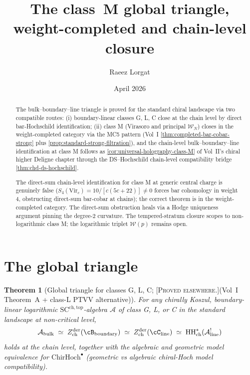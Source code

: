 \documentclass[11pt]{amsart}
\title{The class~M global triangle,\\
weight-completed and chain-level closure}
\author{Raeez Lorgat}
\date{April 2026}
\newtheorem{theorem}{Theorem}[section]
\theoremstyle{definition}
\theoremstyle{remark}
\providecommand{\ChirHoch}{\mathrm{ChirHoch}}
\providecommand{\Zder}{Z^{\mathrm{der}}_{\mathrm{ch}}}
\providecommand{\cA}{\mathcal{A}}
\providecommand{\cW}{\mathcal{W}}
\providecommand{\ClaimStatusProvedElsewhere}{\textsc{[Proved elsewhere.]}}
\begin{document}
\maketitle

\begin{abstract}
The bulk--boundary--line triangle is proved for the standard chiral
landscape via two compatible routes: (i) boundary-linear classes
G, L, C close at the chain level by direct bar-Hochschild
identification; (ii) class M (Virasoro and principal $\cW_N$)
closes in the weight-completed category via the MC5 pattern
(Vol~I \ref*{thm:completed-bar-cobar-strong} plus
\ref*{prop:standard-strong-filtration}), and the chain-level
bulk--boundary--line identification at class M follows as
\ref*{cor:universal-holography-class-M} of Vol~II's chiral
higher Deligne chapter through the DS--Hochschild chain-level
compatibility bridge \ref*{thm:chd-ds-hochschild}.

The direct-sum chain-level identification for class M at generic
central charge is genuinely false (\(S_4(\mathrm{Vir}_c) =
10/[c(5c+22)] \neq 0\) forces bar cohomology in weight~$4$,
obstructing direct-sum bar-cobar at chains); the correct theorem
is in the weight-completed category. The direct-sum obstruction heals via a Hodge
uniqueness argument pinning the degree-$2$ curvature. The
tempered-stratum closure scopes to non-logarithmic class M; the
logarithmic triplet $\cW(p)$ remains open.
\end{abstract}

\section{The global triangle}
\label{sec:global-triangle-classM}

\begin{theorem}[Global triangle for classes G, L, C;
\ClaimStatusProvedElsewhere (Vol~I Theorem~A + class-L PTVV
alternative)]%
\label{thm:triangle-GLC}%
For any chirally Koszul, boundary-linear logarithmic
$\mathrm{SC}^{\mathrm{ch,top}}$-algebra $\cA$ of class G, L, or C
in the standard landscape at non-critical level,
\[
  \cA_{\mathrm{bulk}}
  \;\simeq\;
  \Zder(\cB_{\mathrm{boundary}})
  \;\simeq\;
  \Zder(\cC_{\mathrm{line}})
  \;\simeq\;
  \mathrm{HH}^*_{\mathrm{ch}}(\cA^{!}_{\mathrm{line}})
\]
holds at the chain level, together with the algebraic and geometric
model equivalence for $\ChirHoch^\bullet$ (geometric vs algebraic chiral-Hoch model compatibility).
\end{theorem}
\end{document}
